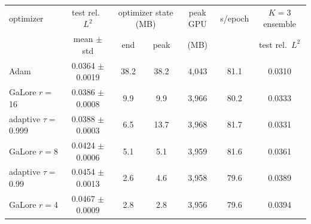 \begin{tabular}{lcccccc}
\toprule
optimizer & test rel.\ $L^2$ & \multicolumn{2}{c}{optimizer state (MB)} & peak GPU & s/epoch & $K{=}3$ ensemble \\
 & mean $\pm$ std & end & peak & (MB) & & test rel.\ $L^2$ \\
\midrule
Adam & 0.0364 $\pm$ 0.0019 & 38.2 & 38.2 & 4,043 & 81.1 & 0.0310 \\
GaLore $r{=}$16 & 0.0386 $\pm$ 0.0008 & 9.9 & 9.9 & 3,966 & 80.2 & 0.0333 \\
adaptive $\tau{=}$0.999 & 0.0388 $\pm$ 0.0003 & 6.5 & 13.7 & 3,968 & 81.7 & 0.0331 \\
GaLore $r{=}$8 & 0.0424 $\pm$ 0.0006 & 5.1 & 5.1 & 3,959 & 81.6 & 0.0361 \\
adaptive $\tau{=}$0.99 & 0.0454 $\pm$ 0.0013 & 2.6 & 4.6 & 3,958 & 79.6 & 0.0389 \\
GaLore $r{=}$4 & 0.0467 $\pm$ 0.0009 & 2.8 & 2.8 & 3,956 & 79.6 & 0.0394 \\
\bottomrule
\end{tabular}